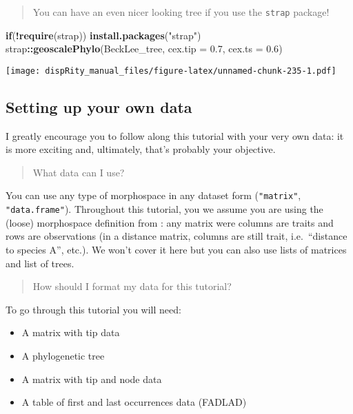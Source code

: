 \documentclass[
]{book}
\newenvironment{Shaded}{\begin{snugshade}}{\end{snugshade}}
\newcommand{\AttributeTok}[1]{\textcolor[rgb]{0.13,0.29,0.53}{#1}}
\newcommand{\ControlFlowTok}[1]{\textcolor[rgb]{0.13,0.29,0.53}{\textbf{#1}}}
\newcommand{\FloatTok}[1]{\textcolor[rgb]{0.00,0.00,0.81}{#1}}
\newcommand{\FunctionTok}[1]{\textcolor[rgb]{0.13,0.29,0.53}{\textbf{#1}}}
\newcommand{\NormalTok}[1]{#1}
\newcommand{\SpecialCharTok}[1]{\textcolor[rgb]{0.81,0.36,0.00}{\textbf{#1}}}
\newcommand{\StringTok}[1]{\textcolor[rgb]{0.31,0.60,0.02}{#1}}
\providecommand{\tightlist}{%
  \setlength{\itemsep}{0pt}\setlength{\parskip}{0pt}}
\begin{document}
\begin{quote}
You can have an even nicer looking tree if you use the \texttt{strap} package!
\end{quote}

\begin{Shaded}
\begin{Highlighting}[]
\ControlFlowTok{if}\NormalTok{(}\SpecialCharTok{!}\FunctionTok{require}\NormalTok{(strap)) }\FunctionTok{install.packages}\NormalTok{(}\StringTok{"strap"}\NormalTok{)}
\NormalTok{strap}\SpecialCharTok{::}\FunctionTok{geoscalePhylo}\NormalTok{(BeckLee\_tree, }\AttributeTok{cex.tip =} \FloatTok{0.7}\NormalTok{, }\AttributeTok{cex.ts =} \FloatTok{0.6}\NormalTok{)}
\end{Highlighting}
\end{Shaded}

\texttt{[image: dispRity\_manual\_files/figure-latex/unnamed-chunk-235-1.pdf]}

\hypertarget{setting-up-your-own-data}{%
\subsection{Setting up your own data}\label{setting-up-your-own-data}}

I greatly encourage you to follow along this tutorial with your very own data: it is more exciting and, ultimately, that's probably your objective.

\begin{quote}
What data can I use?
\end{quote}

You can use any type of morphospace in any dataset form (\texttt{"matrix"}, \texttt{"data.frame"}). Throughout this tutorial, you we assume you are using the (loose) morphospace definition from \citet{Guillerme2020}: any matrix were columns are traits and rows are observations (in a distance matrix, columns are still trait, i.e.~``distance to species A'', etc.).
We won't cover it here but you can also use lists of matrices and list of trees.

\begin{quote}
How should I format my data for this tutorial?
\end{quote}

To go through this tutorial you will need:

\begin{itemize}
\tightlist
\item
  A matrix with tip data
\item
  A phylogenetic tree
\item
  A matrix with tip and node data
\item
  A table of first and last occurrences data (FADLAD)
\end{itemize}
\end{document}
